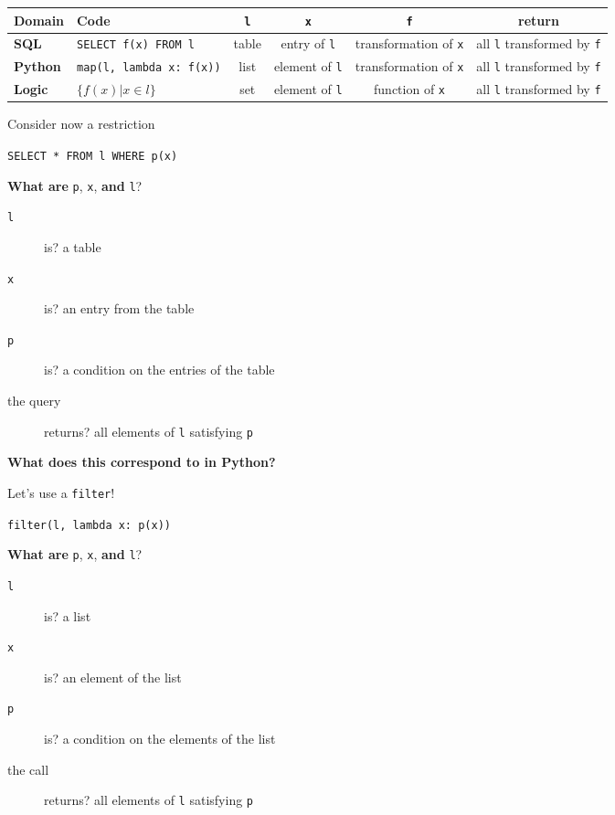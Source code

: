 \documentclass{beamer}
\begin{document}
\begin{textslide}
{
\tiny
\begin{tabular}{| l | p{1.5cm} | c | c | c | c |}
\hline
\textbf{Domain} & \textbf{Code} & \texttt{l} & \texttt{x} & \texttt{f} & \textbf{return} \\
\hline
\textbf{SQL} & \texttt{SELECT f(x) FROM l} & table & entry of \texttt{l} & transformation of \texttt{x} & all \texttt{l} transformed by \texttt{f} \\
\hline
\textbf{Python} & \texttt{map(l, lambda x: f(x))} & list & element of \texttt{l} & transformation of \texttt{x} & all \texttt{l} transformed by \texttt{f} \\
\hline
\textbf{Logic} \pause & $\{ f(x) | x \in l \}$ & set & element of \texttt{l} & function of \texttt{x} & all \texttt{l} transformed by \texttt{f} \\
\hline
\end{tabular}
}
\end{textslide}

\begin{slide}{
\item Consider now a restriction
\item \texttt{SELECT * FROM l WHERE p(x)}
\item \textbf{What are} \texttt{p}, \texttt{x}, \textbf{and} \texttt{l}?
\begin{description}
\item[\texttt{l}] is? \pause a table
\item[\texttt{x}] is? \pause an entry from the table
\item[\texttt{p}] is? \pause a condition on the entries of the table
\item[the query] returns? all elements of \texttt{l} satisfying \texttt{p}
\end{description}
\item \textbf{What does this correspond to in Python?}
}\end{slide}

\begin{slide}{
\item Let's use a \texttt{filter}!
\item \texttt{filter(l, lambda x: p(x))}
\item \textbf{What are} \texttt{p}, \texttt{x}, \textbf{and} \texttt{l}?
\begin{description}
\item[\texttt{l}] is? \pause a list
\item[\texttt{x}] is? \pause an element of the list
\item[\texttt{p}] is? \pause a condition on the elements of the list
\item[the call] returns? all elements of \texttt{l} satisfying \texttt{p}
\end{description}
}\end{slide}
\end{document}
